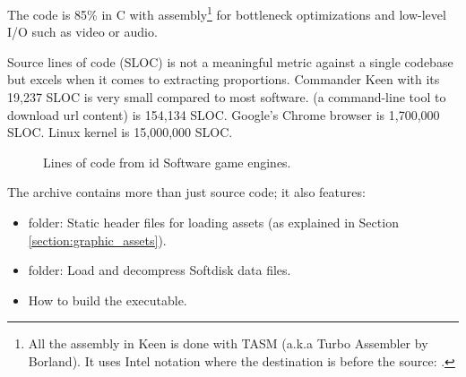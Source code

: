 \documentclass[book.tex]{subfiles}
\begin{document}
\par
 The code is 85\% in C with assembly\footnote{All the assembly in Keen is done with TASM (a.k.a Turbo Assembler by Borland). It uses Intel notation where the destination is before the source:   .} for bottleneck optimizations and low-level I/O such as video or audio.\\
 \par
   Source lines of code (SLOC) is not a meaningful metric against a single codebase but excels when it comes to extracting proportions. Commander Keen with its 19,237 SLOC is very small compared to most software.  (a command-line tool to download url content) is 154,134 SLOC. Google's Chrome browser is 1,700,000 SLOC. Linux kernel is 15,000,000 SLOC.\\
 \par
\begin{figure}[H]
\centering
   \caption{Lines of code from id Software game engines.}
 \end{figure}
 
\par


 
The archive contains more than just source code; it also features:
\begin{itemize}
\item {} folder: Static header files for loading assets (as explained in Section \ref{section:graphic_assets}).
\item {} folder: Load and decompress Softdisk data files.
\item {} How to build the executable. 
\end{itemize}
\end{document}
